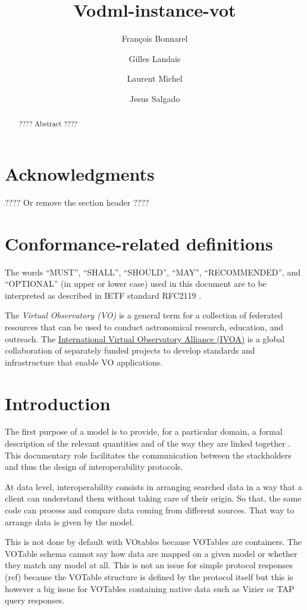 \documentclass[11pt,a4paper]{ivoa}
\title{Vodml-instance-vot}
\author{François Bonnarel}
\author{Gilles Landais}
\author{Laurent Michel}
\author{Jesus Salgado}
\begin{document}
\begin{abstract}
???? Abstract ????
\end{abstract}


\section*{Acknowledgments}

???? Or remove the section header ????

\section*{Conformance-related definitions}

The words ``MUST'', ``SHALL'', ``SHOULD'', ``MAY'', ``RECOMMENDED'', and
``OPTIONAL'' (in upper or lower case) used in this document are to be
interpreted as described in IETF standard RFC2119 \citep{std:RFC2119}.

The \emph{Virtual Observatory (VO)} is a
general term for a collection of federated resources that can be used
to conduct astronomical research, education, and outreach.
The \href{http://www.ivoa.net}{International
Virtual Observatory Alliance (IVOA)} is a global
collaboration of separately funded projects to develop standards and
infrastructure that enable VO applications.


\section{Introduction}
The first purpose of a model is to provide,  for a particular domain, a formal description of the relevant quantities and of the way they are linked together .
This documentary role facilitates the communication between the stackholders and thus the design of interoperability protocols. 

At data level, interoperability consists in arranging searched data in a way that a client can understand them without taking care of their origin. So that, the same code can process and compare data coming from different sources.  That way to arrange data is given by the model.

This is not done by default with VOtables because VOTables are containers. The VOTable schema cannot say how data are mapped on a given model or whether they match any model at all. This is not an issue for simple protocol responses (ref) because the VOTable structure is defined by the protocol itself but this is however a big issue for VOTables containing native data such as Vizier  or TAP query responses.
\end{document}
